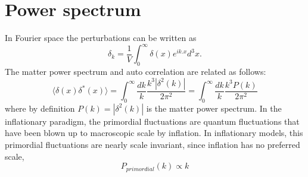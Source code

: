 \section{Power spectrum}
\label{density_ps}
In Fourier space the perturbations can be written as 
\begin{equation}
\delta_{k} = \frac{1}{V} \int^{\infty}_{0} \delta(x) e^{ik.x} d^{3}x .
\end{equation}
The matter power spectrum and auto correlation are related as follows:
\begin{equation}
\langle \delta(x) \delta^{*}(x) \rangle = \int^{\infty}_{0} \frac{dk}{k} \frac{k^{3} |\delta^{2}(k)|}{2\pi^{2}} = \int^{\infty}_{0} \frac{dk}{k}\frac{k^{3} P(k)}{2\pi^{2}}
\end{equation}
where by definition $P(k) = |\delta^{2}(k)|$ is the matter power spectrum.
In the inflationary paradigm, the primordial fluctuations are quantum fluctuations that have been blown up to macroscopic scale by inflation. 
In inflationary models, this primordial fluctuations are nearly scale invariant, since inflation has no preferred scale,
\begin{equation}
P_{primordial}(k) \propto k
\end{equation}

